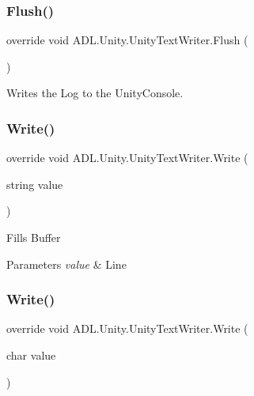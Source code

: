 \subsubsection{\texorpdfstring{Flush()}{Flush()}}
{\footnotesize\ttfamily override void A\+D\+L.\+Unity.\+Unity\+Text\+Writer.\+Flush (\begin{DoxyParamCaption}{ }\end{DoxyParamCaption})}



Writes the Log to the Unity\+Console. 

\mbox{\label{class_a_d_l_1_1_unity_1_1_unity_text_writer_ad951026a7b9df781b94fbc9a5274ac51}} 
\subsubsection{\texorpdfstring{Write()}{Write()}\hspace{0.1cm}{\footnotesize\ttfamily [1/3]}}
{\footnotesize\ttfamily override void A\+D\+L.\+Unity.\+Unity\+Text\+Writer.\+Write (\begin{DoxyParamCaption}\item[{string}]{value }\end{DoxyParamCaption})}



Fills Buffer 


\begin{DoxyParams}{Parameters}
{\em value} & Line\\
\hline
\end{DoxyParams}
\mbox{\label{class_a_d_l_1_1_unity_1_1_unity_text_writer_a9636a16d9e1f9b04d76d4087688bac3a}} 
\subsubsection{\texorpdfstring{Write()}{Write()}\hspace{0.1cm}{\footnotesize\ttfamily [2/3]}}
{\footnotesize\ttfamily override void A\+D\+L.\+Unity.\+Unity\+Text\+Writer.\+Write (\begin{DoxyParamCaption}\item[{char}]{value }\end{DoxyParamCaption})}



